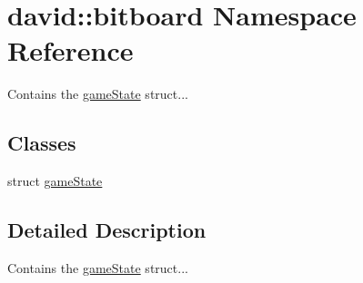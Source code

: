 \hypertarget{namespacedavid_1_1bitboard}{}\section{david\+:\+:bitboard Namespace Reference}
\label{namespacedavid_1_1bitboard}


Contains the \hyperlink{structdavid_1_1bitboard_1_1gameState}{game\+State} struct...  


\subsection*{Classes}
\begin{DoxyCompactItemize}
\item 
struct \hyperlink{structdavid_1_1bitboard_1_1gameState}{game\+State}
\end{DoxyCompactItemize}


\subsection{Detailed Description}
Contains the \hyperlink{structdavid_1_1bitboard_1_1gameState}{game\+State} struct... 